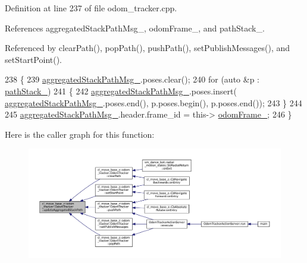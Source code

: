 Definition at line 237 of file odom\+\_\+tracker.\+cpp.



References aggregated\+Stack\+Path\+Msg\+\_\+, odom\+Frame\+\_\+, and path\+Stack\+\_\+.



Referenced by clear\+Path(), pop\+Path(), push\+Path(), set\+Publish\+Messages(), and set\+Start\+Point().


\begin{DoxyCode}
238         \{
239             \hyperlink{classcl__move__base__z_1_1odom__tracker_1_1OdomTracker_a0fb60113ace2791a1f1bbeed59946404}{aggregatedStackPathMsg\_}.poses.clear();
240             \textcolor{keywordflow}{for} (\textcolor{keyword}{auto} &p : \hyperlink{classcl__move__base__z_1_1odom__tracker_1_1OdomTracker_a1ccad1b568b6c65da43ba6639b6bd1ef}{pathStack\_})
241             \{
242                 \hyperlink{classcl__move__base__z_1_1odom__tracker_1_1OdomTracker_a0fb60113ace2791a1f1bbeed59946404}{aggregatedStackPathMsg\_}.poses.insert(
      \hyperlink{classcl__move__base__z_1_1odom__tracker_1_1OdomTracker_a0fb60113ace2791a1f1bbeed59946404}{aggregatedStackPathMsg\_}.poses.end(), p.poses.begin(), p.poses.end());
243             \}
244 
245             \hyperlink{classcl__move__base__z_1_1odom__tracker_1_1OdomTracker_a0fb60113ace2791a1f1bbeed59946404}{aggregatedStackPathMsg\_}.header.frame\_id = this->
      \hyperlink{classcl__move__base__z_1_1odom__tracker_1_1OdomTracker_a54f31af5e74006560d94f266297853d4}{odomFrame\_};
246         \}
\end{DoxyCode}
Here is the caller graph for this function\+:
\nopagebreak
\begin{figure}[H]
\begin{center}
\leavevmode
\includegraphics[width=350pt]{classcl__move__base__z_1_1odom__tracker_1_1OdomTracker_a7922f1e1e688a2ed62d32d9914985a9f_icgraph}
\end{center}
\end{figure}
\mbox{\label{classcl__move__base__z_1_1odom__tracker_1_1OdomTracker_abe7ba4dbf014e1f2c64b5806ce42c073}} 
